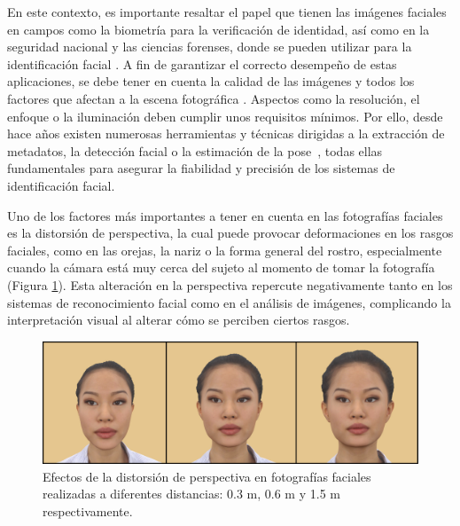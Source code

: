 En este contexto, es importante resaltar el papel que tienen las imágenes faciales en campos como la biometría para la verificación de identidad, así como en la seguridad nacional y las ciencias forenses, donde se pueden utilizar para la identificación facial \cite{80, 81, 82}. A fin de garantizar el correcto desempeño de estas aplicaciones, se debe tener en cuenta la calidad de las imágenes y todos los factores que afectan a la escena fotográfica \cite{86,87}. Aspectos como la resolución, el enfoque o la iluminación deben cumplir unos requisitos mínimos. Por ello, desde hace años existen numerosas herramientas y técnicas dirigidas a la extracción de metadatos, la detección facial \cite{83, 84} o la estimación de la pose~\cite{56, 85}, todas ellas fundamentales para asegurar la fiabilidad y precisión de los sistemas de identificación facial.


Uno de los factores más importantes a tener en cuenta en las fotografías faciales es la distorsión de perspectiva, la cual puede provocar deformaciones en los rasgos faciales, como en las orejas, la nariz o la forma general del rostro, especialmente cuando la cámara está muy cerca del sujeto al momento de tomar la fotografía~\cite{12} (Figura \ref{fig2}). 
Esta alteración en la perspectiva repercute negativamente tanto en los sistemas de reconocimiento facial como en el análisis de imágenes, complicando la interpretación visual al alterar cómo se perciben ciertos rasgos.

\begin{figure}[h]
	\centering
	\includegraphics[scale=0.25]{imagenes/cap1/scd_distorsion.png}
	\caption[Efectos de la distorsión de perspectiva en fotografías faciales.]{Efectos de la distorsión de perspectiva en fotografías faciales realizadas a diferentes distancias: 0.3 m, 0.6 m y 1.5 m respectivamente.}
	\label{fig2}
\end{figure}

